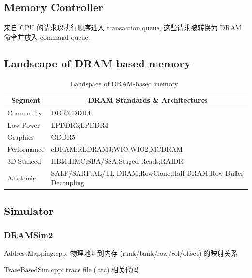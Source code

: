 \documentclass[UTF8,12pt,a4paper]{article}
\begin{document}
\subsection{Memory Controller}
来自 CPU 的请求以执行顺序进入 transaction queue,
这些请求被转换为 DRAM 命令并放入 command queue.

\subsection{Landscape of DRAM-based memory}
\begin{table}
  \begin{small}
    \caption{Landspace of DRAM-based memory~\cite{DBLP:journals/cal/KimYM16}}
    \label{tab:memory_landscape}
    \begin{center}
      \begin{tabular}[c]{l|l}
        \hline
        \multicolumn{1}{c|}{\textbf{Segment}} & 
        \multicolumn{1}{c}{\textbf{DRAM Standards \& Architectures}} \\
        \hline
        Commodity & DDR3;DDR4 \\
        Low-Power & LPDDR3;LPDDR4 \\
        Graphics & GDDR5 \\
        Performance & eDRAM;RLDRAM3;WIO;WIO2;MCDRAM \\
        3D-Stakced & HBM;HMC;SBA/SSA;Staged Reads;RAIDR \\
        Academic & SALP/SARP;AL/TL-DRAM;RowClone;Half-DRAM;Row-Buffer Decoupling \\
        \hline
      \end{tabular}
    \end{center}
  \end{small}
\end{table}

\subsection{Simulator}
\subsubsection{DRAMSim2}
\begin{compactitem}
  \item AddressMapping.cpp: 物理地址到内存 (rank/bank/row/col/offset) 的映射关系
  \item TraceBasedSim.cpp: trace file (.trc) 相关代码
\end{compactitem}
\clearpage
\end{document}
